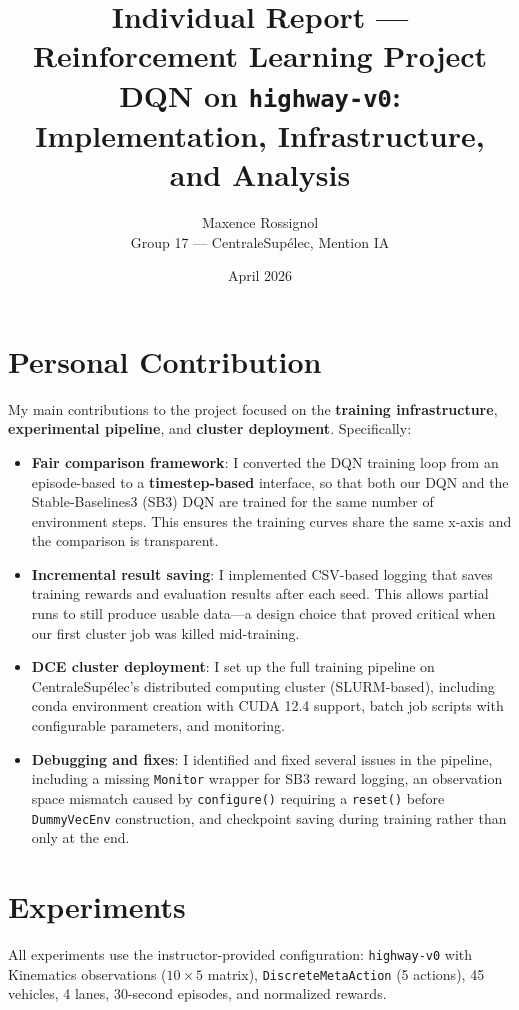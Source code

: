\documentclass[11pt,a4paper]{article}
\title{Individual Report --- Reinforcement Learning Project\\
\large DQN on \texttt{highway-v0}: Implementation, Infrastructure, and Analysis}
\author{Maxence Rossignol\\
Group 17 --- CentraleSup\'elec, Mention IA}
\date{April 2026}
\begin{document}
\maketitle

\section{Personal Contribution}

My main contributions to the project focused on the \textbf{training infrastructure}, \textbf{experimental pipeline}, and \textbf{cluster deployment}. Specifically:

\begin{itemize}
    \item \textbf{Fair comparison framework}: I converted the DQN training loop from an episode-based to a \textbf{timestep-based} interface, so that both our DQN and the Stable-Baselines3 (SB3) DQN are trained for the same number of environment steps. This ensures the training curves share the same x-axis and the comparison is transparent.
    \item \textbf{Incremental result saving}: I implemented CSV-based logging that saves training rewards and evaluation results after each seed. This allows partial runs to still produce usable data---a design choice that proved critical when our first cluster job was killed mid-training.
    \item \textbf{DCE cluster deployment}: I set up the full training pipeline on CentraleSup\'elec's distributed computing cluster (SLURM-based), including conda environment creation with CUDA 12.4 support, batch job scripts with configurable parameters, and monitoring.
    \item \textbf{Debugging and fixes}: I identified and fixed several issues in the pipeline, including a missing \texttt{Monitor} wrapper for SB3 reward logging, an observation space mismatch caused by \texttt{configure()} requiring a \texttt{reset()} before \texttt{DummyVecEnv} construction, and checkpoint saving during training rather than only at the end.
\end{itemize}

\section{Experiments}

All experiments use the instructor-provided configuration: \texttt{highway-v0} with Kinematics observations ($10 \times 5$ matrix), \texttt{DiscreteMetaAction} (5 actions), 45 vehicles, 4 lanes, 30-second episodes, and normalized rewards.
\end{document}
